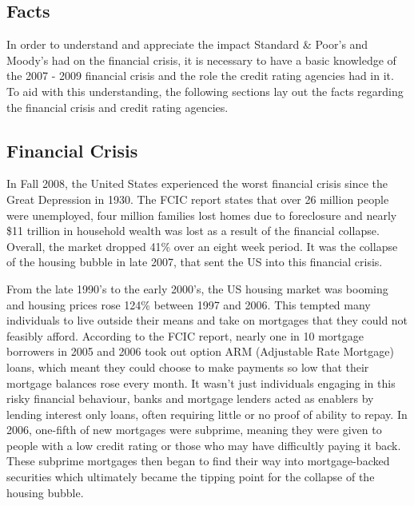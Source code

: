 \documentclass[11pt]{article}
\begin{document}
\thispagestyle{empty}  %
\tableofcontents

\newpage


\begin{multicols}{2}
\setcounter{page}{1}
\section{Facts}

In order to understand and appreciate the impact Standard \& Poor's and Moody's had on the financial crisis, it is necessary to have a basic knowledge of the 2007 - 2009 financial crisis and the role the credit rating agencies had in it.  To aid with this understanding, the following sections lay out the facts regarding the financial crisis and credit rating agencies.


\subsection{Financial Crisis}
In Fall 2008, the United States experienced the worst financial crisis since the Great Depression in 1930.  The FCIC report states that over 26 million people were unemployed, four million families lost homes due to foreclosure and nearly \$11 trillion in household wealth was lost as a result of the financial collapse.\cite[p.~xv]{govtReport}  Overall, the market dropped 41\% over an eight week period.\cite{marketWatch}  It was the collapse of the housing bubble in late 2007, that sent the US into this financial crisis.\cite[p.~xxv]{govtReport} 


From the late 1990's to the early 2000's, the US housing market was booming and housing prices rose 124\% between 1997 and 2006. \cite{economistCreditCrunch}  This tempted many individuals to live outside their means and take on mortgages that they could not feasibly afford.  According to the FCIC report, nearly one in 10 mortgage borrowers in 2005 and 2006 took out option ARM (Adjustable Rate Mortgage) loans, which meant they could choose to make payments so low that their mortgage balances rose every month. \cite[p.~xx]{govtReport} It wasn't just individuals engaging in this risky financial behaviour, banks and mortgage lenders acted as enablers by lending interest only loans, often requiring little or no proof of ability to repay. \cite[p.~xxiii]{govtReport}  In 2006, one-fifth of new mortgages were subprime, meaning they were given to people with a low credit rating or those who may have difficultly paying it back. \cite{economistCreditCrunch}  These subprime mortgages then began to find their way into mortgage-backed securities which ultimately became the tipping point for the collapse of the housing bubble. \cite[p.xxv]{govtReport}


\end{multicols}
\end{document}
